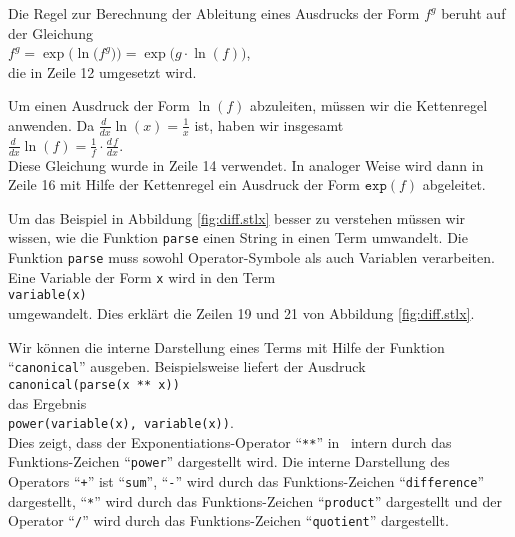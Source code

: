 Die Regel zur Berechnung der  Ableitung eines Ausdrucks der Form $f^g$ beruht auf der
Gleichung
\\[0.2cm]
\hspace*{1.3cm}
$f^g = \exp\bigl(\ln\bigl(f^g\bigr)\bigr) = \exp\bigl(g \cdot \ln(f)\bigr)$,
\\[0.2cm]
die in Zeile 12 umgesetzt wird.  

Um einen Ausdruck der Form $\ln(f)$ abzuleiten, m\"{u}ssen
wir die Kettenregel anwenden.  Da $\frac{d\;}{dx} \ln(x) = \frac{1}{x}$ ist, haben wir insgesamt
\\[0.2cm]
\hspace*{1.3cm}
$\displaystyle \frac{d\;}{dx} \ln(f) = \frac{1}{f} \cdot \frac{d\,f}{dx}$.
\\[0.2cm]
Diese Gleichung wurde in Zeile 14 verwendet.  In analoger Weise wird dann in Zeile 16 mit Hilfe der
Kettenregel ein Ausdruck der Form $\mathtt{exp}(f)$ abgeleitet.

Um das Beispiel in Abbildung \ref{fig:diff.stlx} besser zu verstehen m\"{u}ssen wir wissen, 
wie die Funktion \texttt{parse} einen String in einen Term umwandelt.  Die Funktion 
 \texttt{parse} muss sowohl Operator-Symbole als auch Variablen verarbeiten.
Eine Variable der Form  \texttt{x} wird in den Term
\\[0.2cm]
\hspace*{1.3cm}
\texttt{variable(x)}
\\[0.2cm]
umgewandelt.  Dies erkl\"{a}rt die Zeilen 19 und 21 von Abbildung \ref{fig:diff.stlx}.

Wir k\"{o}nnen die interne Darstellung eines Terms mit Hilfe der Funktion
``\texttt{canonical}'' ausgeben.  Beispielsweise liefert der Ausdruck
\\[0.2cm]
\hspace*{1.3cm}
\texttt{canonical(parse(x ** x))}
\\[0.2cm]
das Ergebnis
\\[0.2cm]
\hspace*{1.3cm}
\texttt{power(variable(x), variable(x))}.
\\[0.2cm]
Dies zeigt, dass der Exponentiations-Operator ``\texttt{**}'' in \setl\ intern durch das Funktions-Zeichen
``\texttt{power}'' dargestellt wird.  Die interne Darstellung des Operators
``\texttt{+}'' ist ``\texttt{sum}'',
``\texttt{-}'' wird durch das Funktions-Zeichen ``\texttt{difference}'' dargestellt,
``\texttt{*}'' wird durch das Funktions-Zeichen ``\texttt{product}'' dargestellt und der Operator
``\texttt{/}'' wird durch das Funktions-Zeichen ``\texttt{quotient}'' dargestellt.

